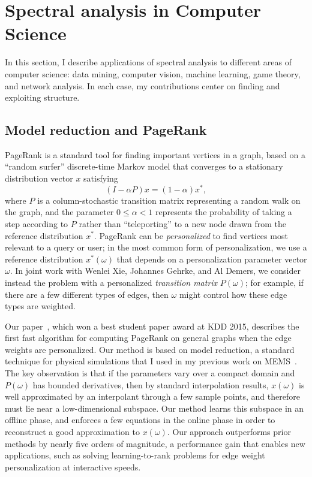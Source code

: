 \documentclass[11pt]{amsart}
\begin{document}
\section{Spectral analysis in Computer Science}
\label{sec-eigen-apps}

In this section, I describe applications of spectral analysis to
different areas of computer science: data mining, computer vision,
machine learning, game theory, and network analysis. In each case, my
contributions center on finding and exploiting structure.

\subsection*{Model reduction and PageRank}

PageRank is a standard tool for finding important vertices in a graph,
based on a ``random surfer'' discrete-time Markov model that converges to
a stationary distribution vector $x$ satisfying
\[
  (I-\alpha P) x = (1-\alpha) x^*,
\]
where $P$ is a column-stochastic transition matrix representing a random
walk on the graph, and the parameter $0 \leq \alpha < 1$  represents the
probability of taking a step according to $P$ rather than
``teleporting'' to a new node drawn from the reference distribution
$x^*$.  PageRank can be {\em personalized} to find vertices
most relevant to a query or user; in the most common form of
personalization, we use a
reference distribution $x^*(\omega)$ that depends on
a personalization parameter vector $\omega$.  In joint work with Wenlei
Xie, Johannes Gehrke, and Al Demers, we consider instead the problem
with a personalized {\em transition matrix} $P(\omega)$;
for example, if there are a few different types of edges,
then $\omega$ might control how these edge types are weighted.

Our paper~\cite{2015-edgeppr}, which won a best student paper award at KDD
2015, describes the first fast algorithm for computing PageRank on
general graphs when the edge weights are personalized. Our method is
based on model reduction, a standard technique for physical simulations
that I used in my previous work on
MEMS~\cite{2001-msm,2004-para,2005-ijnme,2005-sensors}.  The
key observation is that if the parameters vary over a compact domain and
$P(\omega)$ has bounded derivatives, then by standard interpolation
results, $x(\omega)$ is well approximated by an interpolant through a
few sample points, and therefore must lie near a low-dimensional
subspace.  Our method learns this subspace in an offline phase, and
enforces a few equations in the online phase in
order to reconstruct a good approximation to $x(\omega)$.  Our approach
outperforms prior methods by nearly five orders of magnitude, a
performance gain that enables new applications, such as
solving learning-to-rank problems for edge weight personalization at
interactive speeds.
\end{document}

